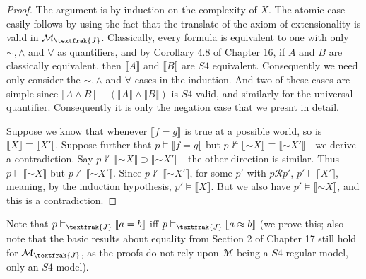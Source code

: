\documentclass{article}
\newcommand*{\oldneg}{\mathord{\sim}}
\newcommand{\lbc}{\llbracket}
\newcommand{\rbc}{\rrbracket}
\theoremstyle{definition}
\begin{document}
\begin{proof}
The argument is by induction on the complexity of $X$. The atomic case easily follows by using the fact that the translate of the axiom of 
extensionality is valid in $\mathcal{M}_\textfrak{J}$.
Classically, every formula is equivalent to one with only $\oldneg,\wedge$ and $\forall$ as quantifiers, and by Corollary 4.8 of Chapter 16, if 
$A$ and $B$ are classically equivalent, then $\lbc A\rbc$ and $\lbc B\rbc$ are $S4$ equivalent. Consequently we need only consider 
the $\oldneg,\wedge$ and $\forall$ cases in the induction. And two of these cases are simple since 
$\lbc A\wedge B\rbc\equiv (\lbc A\rbc\wedge\lbc B\rbc)$ is $S4$ valid, and similarly for the universal quantifier. Consequently it is only the 
negation case that we presnt in detail.

Suppose we know that whenever $\lbc f=g\rbc$ is true at a possible world, so is $\lbc X\rbc\equiv\lbc X'\rbc$. Suppose further that
$p\vDash\lbc f=g\rbc$ but $p\nvDash\lbc\oldneg X\rbc\equiv\lbc\oldneg X'\rbc$ - we derive a contradiction. Say 
$p\nvDash\lbc\oldneg X\rbc\supset\lbc \oldneg X'\rbc$ - the other direction is similar. Thus $p\vDash\lbc\oldneg X\rbc$ but 
$p\nvDash\lbc\oldneg X'\rbc$. Since $p\nvDash\lbc\oldneg X'\rbc$, for some $p'$ with $p\mathcal{R}p'$, 
$p'\vDash\lbc X'\rbc$, meaning, by the induction hypothesis, $p'\vDash\lbc X\rbc$. But we also have 
$p'\vDash\lbc\oldneg X\rbc$, and this is a contradiction.

\end{proof}

Note that $p\vDash_\textfrak{J}\lbc a=b\rbc$ iff 
$p\vDash_\textfrak{J}\lbc a\approx b\rbc$ (we prove this; also note that the basic results about equality from Section 2 of Chapter 17 still 
hold for $\mathcal{M}_\textfrak{J}$, as the proofs do not rely upon $\mathcal{M}$ being a $S4$-regular model, only an $S4$ model).
\end{document}
